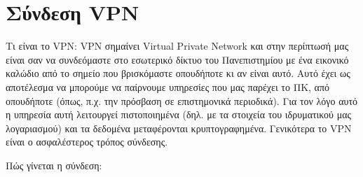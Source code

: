 \documentclass[a4paper,11pt,greek]{article}
\begin{document}
\section{Σύνδεση VPN}
\label{HowToVPN:vpn}\label{HowToVPN::doc}
Τι είναι το VPN: VPN σημαίνει Virtual Private Network και στην
περίπτωσή μας είναι σαν να συνδεόμαστε στο εσωτερικό δίκτυο του
Πανεπιστημίου με ένα εικονικό καλώδιο από το σημείο που βρισκόμαστε
οπουδήποτε κι αν είναι αυτό. Αυτό έχει ως αποτέλεσμα να μπορούμε
να παίρνουμε υπηρεσίες που μας παρέχει το ΠΚ, από οπουδήποτε (όπως,
π.χ. την πρόσβαση σε επιστημονικά περιοδικά). Για τον λόγο αυτό η
υπηρεσία αυτή λειτουργεί πιστοποιημένα (δηλ. με τα στοιχεία του ιδρυματικού
μας λογαριασμού) και τα δεδομένα μεταφέρονται κρυπτογραφημένα.
Γενικότερα το VPN είναι ο ασφαλέστερος τρόπος σύνδεσης.

Πώς γίνεται η σύνδεση:
\end{document}
